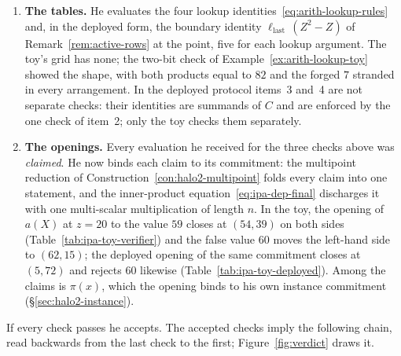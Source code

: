 \documentclass[11pt,a4paper]{article}
\theoremstyle{definition}
\begin{document}
\begin{enumerate}[leftmargin=*, itemsep=2pt]
\item \textbf{The tables.} He evaluates the four lookup
  identities~\eqref{eq:arith-lookup-rules} and, in the deployed form,
  the boundary identity $\ell_{\mathrm{last}}\,(Z^2 - Z)$ of
  Remark~\ref{rem:active-rows} at the point, five for each lookup
  argument. The toy's grid has none; the two-bit check of
  Example~\ref{ex:arith-lookup-toy} showed the shape, with both
  products equal to $82$ and the forged $7$ stranded in every
  arrangement. In the deployed protocol items~3 and~4 are not separate
  checks: their identities are summands of $C$ and are enforced by the
  one check of item~2; only the toy checks them separately.
\item \textbf{The openings.} Every evaluation he received for the three
  checks above was \emph{claimed}. He now binds each claim to its
  commitment: the multipoint reduction of
  Construction~\ref{con:halo2-multipoint} folds every claim into one
  statement, and the inner-product equation~\eqref{eq:ipa-dep-final}
  discharges it with one multi-scalar multiplication of length $n$. In
  the toy, the opening of $a(X)$ at $z = 20$ to the value $59$ closes at
  $(54, 39)$ on both sides (Table~\ref{tab:ipa-toy-verifier}) and the
  false value $60$ moves the left-hand side to $(62, 15)$; the deployed
  opening of the same commitment closes at $(5, 72)$ and rejects $60$
  likewise (Table~\ref{tab:ipa-toy-deployed}). Among the claims is
  $\pi(x)$, which the opening binds to his own instance commitment
  (\S\ref{sec:halo2-instance}).
\end{enumerate}
If every check passes he accepts. The accepted checks imply the
following chain, read backwards from the last check to the first;
Figure~\ref{fig:verdict} draws it.
\end{document}
